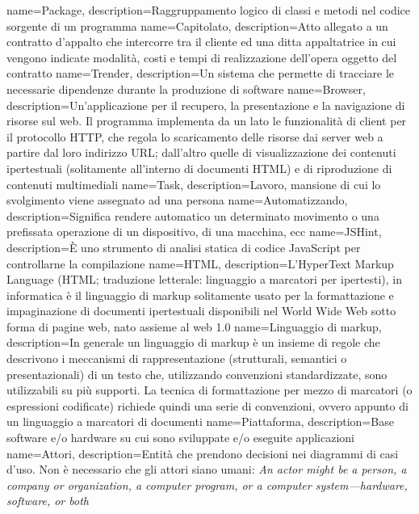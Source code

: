  {
	name=Package,
	description={Raggruppamento logico di classi e metodi nel codice sorgente di un programma}
}
 {
	name=Capitolato,
	description={Atto allegato a un contratto d'appalto che intercorre tra il cliente ed una ditta appaltatrice in cui vengono indicate modalità, costi e tempi di realizzazione dell'opera oggetto del contratto}
}
 {
	name=Trender,
	description={Un sistema che permette di tracciare le necessarie dipendenze durante la produzione di software}
}
 {
	name=Browser,
	description={Un'applicazione per il recupero, la presentazione e la navigazione di risorse sul web. Il programma implementa da un lato le funzionalità di client per il protocollo HTTP, che regola lo scaricamento delle risorse dai server web a partire dal loro indirizzo URL; dall'altro quelle di visualizzazione dei contenuti ipertestuali (solitamente all'interno di documenti HTML) e di riproduzione di contenuti multimediali}
}
 {
	name=Task,
	description={Lavoro, mansione di cui lo svolgimento viene assegnato ad una persona}
}
 {
	name=Automatizzando,
	description={Significa rendere automatico un determinato movimento o una prefissata operazione di un dispositivo, di una macchina, ecc}
}
 {
	name=JSHint,
	description={È uno strumento di analisi statica di codice JavaScript per controllarne la compilazione}
}
 {
	name=HTML,
	description={L'HyperText Markup Language (HTML; traduzione letterale: linguaggio a marcatori per ipertesti), in informatica è il linguaggio di markup solitamente usato per la formattazione e impaginazione di documenti ipertestuali disponibili nel World Wide Web sotto forma di pagine web, nato assieme al web 1.0}
}
 {
	name=Linguaggio di markup,
	description={In generale un linguaggio di markup è un insieme di regole che descrivono i meccanismi di rappresentazione (strutturali, semantici o presentazionali) di un testo che, utilizzando convenzioni standardizzate, sono utilizzabili su più supporti. La tecnica di formattazione per mezzo di marcatori (o espressioni codificate) richiede quindi una serie di convenzioni, ovvero appunto di un linguaggio a marcatori di documenti}
}
 {
	name=Piattaforma,
	description={Base software e/o hardware su cui sono sviluppate e/o eseguite applicazioni}
}
 {
	name=Attori,
	description={Entità che prendono decisioni nei diagrammi di casi d'uso. Non è necessario che gli attori siano umani: \textit{An actor might be a person, a company or organization, a computer program, or a computer system—hardware, software, or both}}
}
